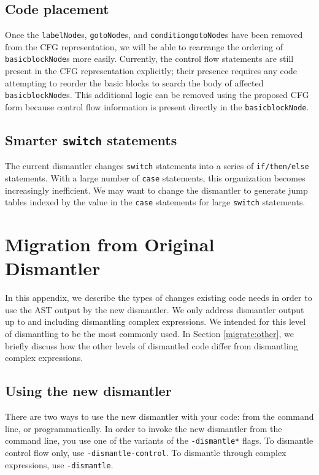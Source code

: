 \documentclass{article}
\begin{document}
\subsection{\label{future:code} Code placement}

Once the \texttt{labelNode}s, \texttt{gotoNode}s, and 
\texttt{conditiongotoNode}s have been removed from the CFG representation,
we will be able to rearrange the ordering of \texttt{basicblockNode}s
more easily.  Currently, the control flow statements are still present
in the CFG representation explicitly;  their presence requires any code
attempting to reorder the basic blocks to search the body of affected
\texttt{basicblockNode}s.  This additional logic can be removed using
the proposed CFG form because control flow information is present directly
in the \texttt{basicblockNode}.

\subsection{\label{future:switch} Smarter \texttt{switch} statements}

The current dismantler changes \texttt{switch} statements into a series of
\texttt{if/then/else} statements.  With a large number of \texttt{case}
statements, this organization becomes increasingly inefficient.  We may
want to change the dismantler to generate jump tables indexed by the 
value in the \texttt{case} statements for large \texttt{switch} statements.

\appendix

\section{\label{migrate} Migration from Original Dismantler}

In this appendix, we describe the types of changes existing code needs
in order to use the AST output by the new dismantler.  We only address
dismantler output up to and including dismantling complex expressions.
We intended for this level of dismantling to be the most commonly used.
In Section \ref{migrate:other}, we briefly discuss how the other levels
of dismantled code differ from dismantling complex expressions.

\subsection{\label{migrate:using} Using the new dismantler}

There are two ways to use the new dismantler with your code: from the
command line, or programmatically.  In order to invoke the new dismantler
from the command line, you use one of the variants of the
\texttt{-dismantle*} flags.  To dismantle control flow only,
use \texttt{-dismantle-control}.  To dismantle through complex
expressions, use \texttt{-dismantle}.
\end{document}
